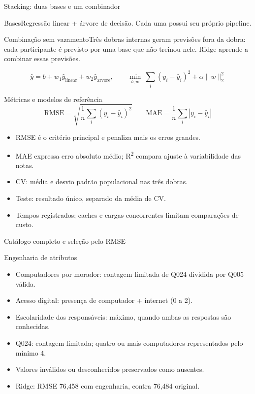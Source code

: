 \begin{frame}{Stacking: duas bases e um combinador}
\begin{block}{Bases}Regressão linear + árvore de decisão. Cada uma possui seu próprio pipeline.\end{block}
\begin{block}{Combinação sem vazamento}Três dobras internas geram previsões fora da dobra: cada participante é previsto por uma base que não treinou nele. Ridge aprende a combinar essas previsões.\end{block}
\[
\widehat{y}=b+w_1\widehat{y}_{\mathrm{linear}}+w_2\widehat{y}_{\mathrm{arvore}},\qquad
\min_{b,w}\ \sum_i(y_i-\widehat y_i)^2+\alpha\lVert w\rVert_2^2
\]
\end{frame}
\begin{frame}{Métricas e modelos de referência}
\[
\mathrm{RMSE}=\sqrt{\frac{1}{n}\sum_i(y_i-\widehat y_i)^2}
\qquad
\mathrm{MAE}=\frac{1}{n}\sum_i|y_i-\widehat y_i|
\]
\begin{itemize}\item RMSE é o critério principal e penaliza mais os erros grandes.
\item MAE expressa erro absoluto médio; R\textsuperscript{2} compara ajuste à variabilidade das notas.
\item CV: média e desvio padrão populacional nas três dobras.
\item Teste: resultado único, separado da média de CV.
\item Tempos registrados; caches e cargas concorrentes limitam comparações de custo.\end{itemize}
\end{frame}
\begin{frame}{Catálogo completo e seleção pelo RMSE}
\end{frame}
\begin{frame}{Engenharia de atributos}
\begin{itemize}\item Computadores por morador: contagem limitada de Q024 dividida por Q005 válida.
\item Acesso digital: presença de computador + internet (0 a 2).
\item Escolaridade dos responsáveis: máximo, quando ambas as respostas são conhecidas.
\item Q024: contagem limitada; quatro ou mais computadores representados pelo mínimo 4.
\item Valores inválidos ou desconhecidos preservados como ausentes.
\item Ridge: RMSE 76,458 com engenharia, contra 76,484 original.\end{itemize}
\end{frame}
